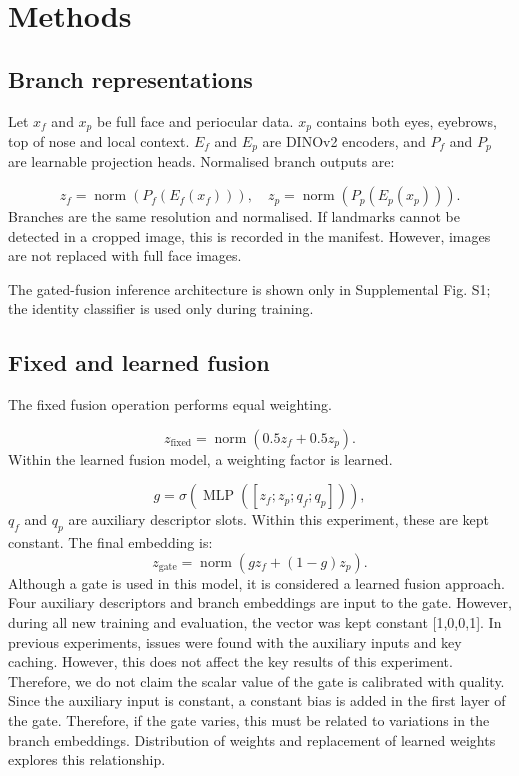 \documentclass[10pt,lettersize,journal]{IEEEtran}
\begin{document}
\section{Methods}
\subsection{Branch representations}
Let \ensuremath{x_f} and \ensuremath{x_p} be full face and periocular data. \ensuremath{x_p} contains both eyes, eyebrows, top of nose and local context. \ensuremath{E_f} and \ensuremath{E_p} are DINOv2 encoders, and \ensuremath{P_f} and \ensuremath{P_p} are learnable projection heads. Normalised branch outputs are:\par
\begin{equation}
z_f=\operatorname{norm}(P_f(E_f(x_f))),\quad z_p=\operatorname{norm}(P_p(E_p(x_p))).
\end{equation}
Branches are the same resolution and normalised. If landmarks cannot be detected in a cropped image, this is recorded in the manifest. However, images are not replaced with full face images.\par
The gated-fusion inference architecture is shown only in Supplemental Fig. S1; the identity classifier is used only during training.\par
\subsection{Fixed and learned fusion}
The fixed fusion operation performs equal weighting.\par
\begin{equation}
z_{\mathrm{fixed}}=\operatorname{norm}(0.5z_f+0.5z_p).
\end{equation}
Within the learned fusion model, a weighting factor is learned.\par
\begin{equation}
g=\sigma\!\left(\operatorname{MLP}([z_f;z_p;q_f;q_p])\right),
\end{equation}
\ensuremath{q_f} and \ensuremath{q_p} are auxiliary descriptor slots. Within this experiment, these are kept constant. The final embedding is:
\begin{equation}
z_{\mathrm{gate}}=\operatorname{norm}(gz_f+(1-g)z_p).
\end{equation}
Although a gate is used in this model, it is considered a learned fusion approach. Four auxiliary descriptors and branch embeddings are input to the gate. However, during all new training and evaluation, the vector was kept constant [1,0,0,1]. In previous experiments, issues were found with the auxiliary inputs and key caching. However, this does not affect the key results of this experiment. Therefore, we do not claim the scalar value of the gate is calibrated with quality. Since the auxiliary input is constant, a constant bias is added in the first layer of the gate. Therefore, if the gate varies, this must be related to variations in the branch embeddings. Distribution of weights and replacement of learned weights explores this relationship.\par
\end{document}
